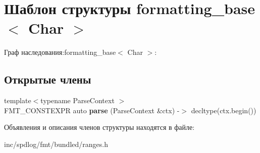 \hypertarget{structformatting__base}{}\section{Шаблон структуры formatting\+\_\+base$<$ Char $>$}
\label{structformatting__base}


Граф наследования\+:formatting\+\_\+base$<$ Char $>$\+:
\subsection*{Открытые члены}
\begin{DoxyCompactItemize}
\item 
\mbox{\label{structformatting__base_a938ab5ae1cf866f08caa3314d779c03e}} 
{\footnotesize template$<$typename Parse\+Context $>$ }\\F\+M\+T\+\_\+\+C\+O\+N\+S\+T\+E\+X\+PR auto {\bfseries parse} (Parse\+Context \&ctx) -\/$>$ decltype(ctx.\+begin())
\end{DoxyCompactItemize}


Объявления и описания членов структуры находятся в файле\+:\begin{DoxyCompactItemize}
\item 
inc/spdlog/fmt/bundled/ranges.\+h\end{DoxyCompactItemize}
